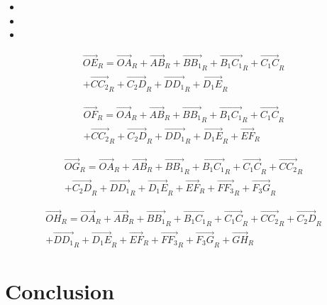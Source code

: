 \documentclass[12pt,a4paper]{article}
\begin{document}
\begin{itemize}
	\item
	\item 
	\item 
\end{itemize}


\medbreak

\medbreak

\medbreak

\medbreak




\begin{equation}
\begin{split}
\vec{OE}_R=\vec{OA}_R+\vec{AB}_R+\vec{B B_1}_R+\vec{B_1 C_1}_R+\vec{C_1 C}_R\\+\vec{C C_2}_R+\vec{C_2 D}_R+\vec{D D_1}_R+\vec{D_1 E}_R
\end{split}
\end{equation}

\begin{equation}
\begin{split}
\vec{OF}_R=\vec{OA}_R+\vec{AB}_R+\vec{B B_1}_R+\vec{B_1 C_1}_R+\vec{C_1 C}_R\\+\vec{C C_2}_R+\vec{C_2 D}_R+\vec{D D_1}_R+\vec{D_1 E}_R+\vec{E F}_R
\end{split}
\end{equation}

\begin{equation}
\begin{split}
\vec{OG}_R=\vec{OA}_R+\vec{AB}_R+\vec{B B_1}_R+\vec{B_1 C_1}_R+\vec{C_1 C}_R+\vec{C C_2}_R\\+\vec{C_2 D}_R+\vec{D D_1}_R+\vec{D_1 E}_R+\vec{E F}_R+\vec{F F_3}_R+\vec{F_3 G}_R
\end{split}
\end{equation}

\begin{equation}
\begin{split}
\vec{OH}_R=\vec{OA}_R+\vec{AB}_R+\vec{B B_1}_R+\vec{B_1 C_1}_R+\vec{C_1 C}_R+\vec{C C_2}_R+\vec{C_2 D}_R\\+\vec{D D_1}_R+\vec{D_1 E}_R+\vec{E F}_R+\vec{F F_3}_R+\vec{F_3 G}_R+\vec{G H}_R
\end{split}
\end{equation}

 
\section{Conclusion}
\end{document}
